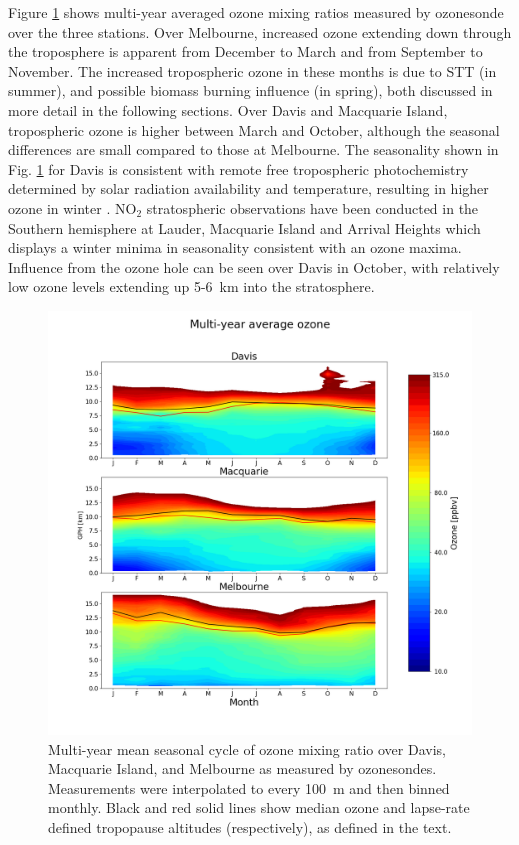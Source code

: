 \documentclass[acp, manuscript]{copernicus} %
\begin{document}
    Figure \ref{fig:seasonaltropozone} shows multi-year averaged ozone mixing ratios measured by ozonesonde over the three stations.
    Over Melbourne, increased ozone extending down through the troposphere is apparent from December to March and from September to November.
    The increased tropospheric ozone in these months is due to STT (in summer), and possible biomass burning influence (in spring), both discussed in more detail in the following sections.
    Over Davis and Macquarie Island, tropospheric ozone is higher between March and October, although the seasonal differences are small compared to those at Melbourne.
    The seasonality shown in Fig. \ref{fig:seasonaltropozone} for Davis is consistent with remote free tropospheric photochemistry determined by solar radiation availability and temperature, resulting in higher ozone in winter \citep{Lelieveld2000}.
    NO$_2$ stratospheric observations have been conducted in the Southern hemisphere at Lauder, Macquarie Island and Arrival Heights \citep[i.e.][]{Struthers2004} which displays a winter minima in seasonality consistent with an ozone maxima.
    Influence from the ozone hole can be seen over Davis in October, with relatively low ozone levels extending up 5-6~km into the stratosphere.

    \begin{figure}[t]
      \includegraphics[width=12.0cm]{figures/seasonaltropozone}
      \caption{ %
	Multi-year mean seasonal cycle of ozone mixing ratio over Davis, Macquarie Island, and Melbourne as measured by ozonesondes.
	Measurements were interpolated to every 100~m and then binned monthly.
	Black and red solid lines show median ozone and lapse-rate defined tropopause altitudes (respectively), as defined in the text. }
      \label{fig:seasonaltropozone}
    \end{figure}
\end{document}
